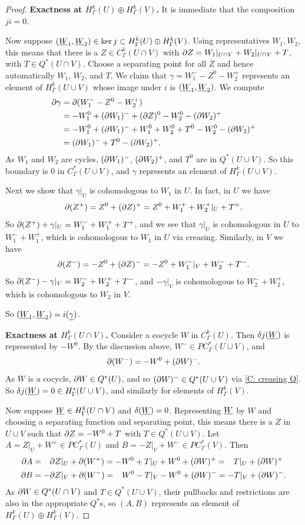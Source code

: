 \begin{proof}
\textbf{Exactness at $H^k_\Gamma(U) \oplus H^k_\Gamma(V)$.}
It is immediate that the composition $ji = 0$.

Now suppose $(\underline{W}_1,\underline{W}_2) \in \ker j \subset H^k_\Gamma(U) \oplus H^k_\Gamma(V)$. Using representatives $W_1,W_2$, this means that there is a $Z \in C^k_\Gamma(U \cap V)$ with $\partial Z = W_1|_{U \cap V}+W_2|_{U \cap V}+T$, with $T \in Q^*(U \cap V)$. Choose a separating point for all $Z$ and hence automatically $W_1$, $W_2$, and $T$. We claim that $\gamma = W_1^- - Z^0 -W_2^+$ represents an element of $H^k_\Gamma(U \cup V)$ whose image under $i$ is $(\underline{W}_1,\underline{W}_2)$.
We compute
\begin{align*}\partial \gamma& = \partial (W_1^- - Z^0 -W_2^+)\\
& = -W_1^0 +(\partial W_1)^- + (\partial Z)^0 - W_2^0 - (\partial W_2)^+\\
& = -W_1^0 +(\partial W_1)^- + W_1^0+W_2^0+T^0 - W_2^0 - (\partial W_2)^+\\
& = (\partial W_1)^- +T^0 - (\partial W_2)^+.
\end{align*}
As $W_1$ and $W_2$ are cycles, $(\partial W_1)^-$, $(\partial W_2)^+$, and $T^0$ are in $Q^*(U \cup V)$. So this boundary is $0$ in $C^*_\Gamma(U \cup V)$, and $\gamma$ represents an element of $H^k_\Gamma(U \cup V)$.


Next we show that $\gamma|_U$ is cohomologous to $W_1$ in $U$. In fact, in $U$ we have
$$\partial (Z^+) = Z^0+(\partial Z)^+ = Z^0+ W_1^++ W_2^+|_{U}+T^+.$$ So
$\partial (Z^+) +\gamma|_U = W_1^-+W_1^+ +T^+$, and we see that $\gamma|_U$ is cohomologous in $U$ to $W_1^-+W_1^+$, which is cohomologous to $W_1$ in $U$ via creasing. Similarly, in $V$ we have
 $$\partial (Z^-) = -Z^0+(\partial Z)^- = -Z^0+W_1^-|_{V}+ W_2^-+T^-.$$
So
$\partial(Z^-) - \gamma|_V = W_2^-+W_2^+ +T^-$, and $-\gamma|_V$ is cohomologous to $W_2^-+W_2^+$, which is cohomologous to $W_2$ in $V$.

So $(\underline{W}_1,\underline{W}_2) = i(\underline{\gamma})$.


\textbf{Exactness at $H^k_\Gamma(U \cap V)$.}
Consider a cocycle $W$ in $C^k_\Gamma(U)$. Then $\delta j(\underline{W})$ is represented by $-W^0$. By the discussion above, $W^- \in PC^*_\Gamma(U \cup V)$, and $$\partial (W^-) = -W^0+ (\partial W)^-.$$ As $W$ is a cocycle, $\partial W \in Q^*(U)$, and so $(\partial W)^- \in Q^*(U \cup V)$ via \cref{C: creasing Q}. So $\delta j(\underline{W}) = 0 \in H^*_\Gamma(U \cup V)$, and similarly for elements of $H^k_\Gamma(V)$.


Now suppose $\underline{W} \in H^k_\Gamma(U \cap V)$ and $\delta(\underline{W}) = 0$. Representing $\underline{W}$ by $W$ and choosing a separating function and separating point, this means there is a $Z$ in $U \cup V$ such that $\partial Z = -W^0+T$ with $T \in Q^*(U \cup V)$. Let $A = Z|_U+ W^+ \in PC^*_\Gamma(U)$ and $B = -Z|_V +W^- \in PC^*_\Gamma(V)$. Then
\begin{align*}
\partial A& = \phantom{-}\partial Z|_U+ \partial( W^+) = -W^0+T|_U +W^0+(\partial W)^{+} = \phantom{-}T|_U+(\partial W)^{+}\\
\partial B& = -\partial Z|_V+ \partial (W^-) = \phantom{-}W^0-T|_V -W^0+(\partial W)^{-} = -T|_V+(\partial W)^{-}.
\end{align*}
As $\partial W \in Q^*(U \cap V)$ and $T \in Q^*(U \cup V)$, their pullbacks and restrictions are also in the appropriate $Q^*$s, so $(A,B)$ represents an element of $H^k_\Gamma(U) \oplus H^k_\Gamma(V)$.


\end{proof}
